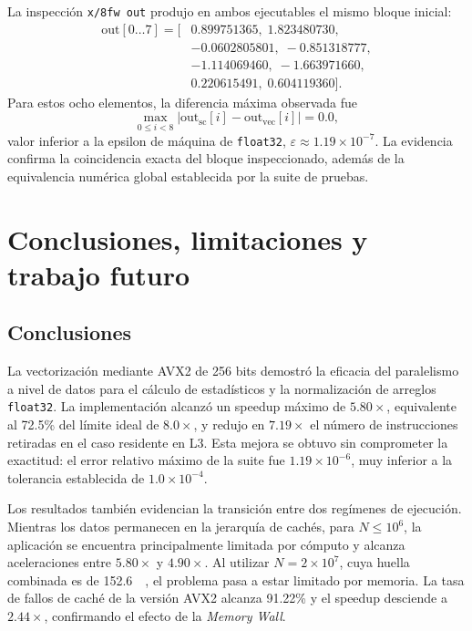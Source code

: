 \documentclass[journal]{IEEEtran}
\begin{document}
La inspección \texttt{x/8fw out} produjo en ambos ejecutables el mismo bloque
inicial:
\begin{equation}
\begin{aligned}
  \mathrm{out}[0\ldots7]=[&0.899751365,\;1.823480730,\\
  &-0.0602805801,\;-0.851318777,\\
  &-1.114069460,\;-1.663971660,\\
  &0.220615491,\;0.604119360].
\end{aligned}
\label{eq:gdb-output-values}
\end{equation}
Para estos ocho elementos, la diferencia máxima observada fue
\begin{equation}
  \max_{0\leq i<8}
  \left|\mathrm{out}_{\mathrm{sc}}[i]
  -\mathrm{out}_{\mathrm{vec}}[i]\right|=0.0,
  \label{eq:gdb-max-difference}
\end{equation}
valor inferior a la epsilon de máquina de \texttt{float32},
$\varepsilon\approx1.19\times10^{-7}$. La evidencia confirma la coincidencia
exacta del bloque inspeccionado, además de la equivalencia numérica global
establecida por la suite de pruebas.

\section{Conclusiones, limitaciones y trabajo futuro}

\subsection{Conclusiones}

La vectorización mediante AVX2 de 256 bits demostró la eficacia del paralelismo
a nivel de datos para el cálculo de estadísticos y la normalización de arreglos
\texttt{float32}. La implementación alcanzó un speedup máximo de
$5.80\times$, equivalente al 72.5\% del límite ideal de $8.0\times$, y redujo
en $7.19\times$ el número de instrucciones retiradas en el caso residente en
L3. Esta mejora se obtuvo sin comprometer la exactitud: el error relativo máximo
de la suite fue $1.19\times10^{-6}$, muy inferior a la tolerancia establecida de
$1.0\times10^{-4}$.

Los resultados también evidencian la transición entre dos regímenes de
ejecución. Mientras los datos permanecen en la jerarquía de cachés, para
$N\leq10^6$, la aplicación se encuentra principalmente limitada por cómputo y
alcanza aceleraciones entre $5.80\times$ y $4.90\times$. Al utilizar
$N=2\times10^7$, cuya huella combinada es de \SI{152.6}{\mebi\byte}, el
problema pasa a estar limitado por memoria. La tasa de fallos de caché de la
versión AVX2 alcanza 91.22\% y el speedup desciende a $2.44\times$, confirmando
el efecto de la \textit{Memory Wall}.
\end{document}
